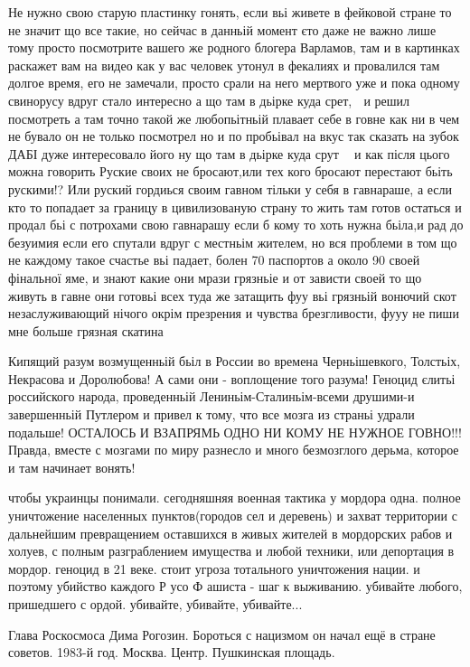 Не нужно свою старую пластинку гонять, если вьі живете в фейковой стране то не
значит що все такие, но сейчас в данньій момент єто даже не важно лише тому
просто посмотрите вашего же родного блогера Варламов, там и в картинках
раскажет вам на видео как у вас человек утонул в фекалиях и провалился там
долгое время, его не замечали, просто срали на него мертвого уже и пока одному
свинорусу вдруг стало интересно а що там в дьірке куда срет, 🤣 и решил
посмотреть а там точно такой же любопьітньій плавает себе в говне как ни в чем
не бувало он не только посмотрел но и по пробьівал на вкус так сказать на зубок
ДАБІ дуже интересовало його ну що там в дьірке куда срут 🤣🤣 и как після цього
можна говорить Руские своих не бросают,или тех кого бросают перестают бьіть
рускими!? Или руский гордиься своим гавном тільки у себя в гавнараше, а если
кто то попадает за границу в цивилизованую страну то жить там готов остаться и
продал бьі с потрохами свою гавнарашу если б кому то хоть нужна бьіла,и рад до
безуимия если его спутали вдруг с местньім жителем, но вся проблеми в том що не
каждому такое счастье вьі падает, болен 70%
паспортов а около 90%
своей фінальної яме, и знают какие они мрази грязньіе и от зависти своей то що
живуть в гавне они готовьі всех туда же затащить фуу вьі грязньій вонючий скот
незаслуживающий нічого окрім презрения и чувства брезгливости, фууу не пиши мне
больше грязная скатина

Кипящий разум возмущенньій бьіл в России во времена Черньішевкого, Толстьіх,
Некрасова и Доролюбова! А сами они - воплощение того разума! Геноцид єлитьі
российского народа, проведенньій Лениньім-Сталиньім-всеми друшими-и
завершенньій Путлером и привел к тому, что все мозга из страньі удрали
подальше! ОСТАЛОСЬ И ВЗАПРЯМЬ ОДНО НИ КОМУ НЕ НУЖНОЕ ГОВНО!!! Правда, вместе с
мозгами по миру разнесло и много безмозглого дерьма, которое и там начинает
вонять!

чтобы украинцы понимали. сегодняшняя военная тактика у мордора одна. полное
уничтожение населенных пунктов(городов сел и деревень) и захват территории с
дальнейшим превращением оставшихся в живых жителей в мордорских рабов и холуев,
с полным разграблением имущества и любой техники, или депортация в мордор.
геноцид в 21 веке. стоит угроза тотального уничтожения нации. и поэтому
убийство каждого Р усо Ф ашиста - шаг к выживанию. убивайте любого, пришедшего
с ордой. убивайте, убивайте, убивайте...

Глава Роскосмоса Дима Рогозин. Бороться с нацизмом он начал ещё в стране
советов.  1983-й год. Москва. Центр. Пушкинская площадь.


